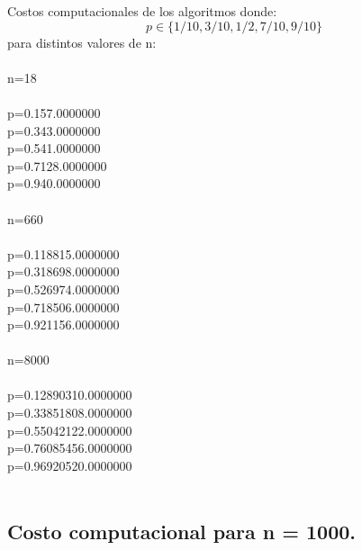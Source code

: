 \documentclass[12pt,letterpaper]{scrartcl}
\begin{document}
Costos computacionales de los algoritmos donde: \[p \in \{1/10, 3/10, 1/2, 7/10, 9/10\} \] para distintos valores de n:
\\\\
n=18
\\\\
p=0.1\hspace{1cm}57.0000000
\\
p=0.3\hspace{1cm}43.0000000
\\
p=0.5\hspace{1cm}41.0000000
\\
p=0.7\hspace{1cm}128.0000000
\\
p=0.9\hspace{1cm}40.0000000
\\\\
n=660
\\\\
p=0.1\hspace{1cm}18815.0000000
\\
p=0.3\hspace{1cm}18698.0000000
\\
p=0.5\hspace{1cm}26974.0000000
\\
p=0.7\hspace{1cm}18506.0000000
\\
p=0.9\hspace{1cm}21156.0000000
\\\\
n=8000
\\\\
p=0.1\hspace{1cm}2890310.0000000
\\
p=0.3\hspace{1cm}3851808.0000000
\\
p=0.5\hspace{1cm}5042122.0000000
\\
p=0.7\hspace{1cm}6085456.0000000
\\
p=0.9\hspace{1cm}6920520.0000000
\\\\
\subsection{Costo computacional para n = 1000.}
\end{document}
